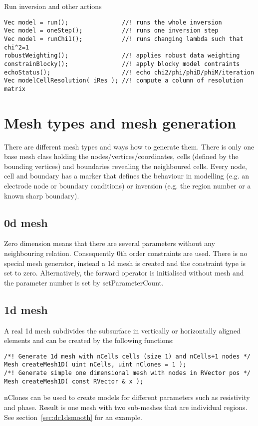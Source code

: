 Run inversion and other actions
\begin{lstlisting}
Vec model = run();               //! runs the whole inversion
Vec model = oneStep();           //! runs one inversion step
Vec model = runChi1();           //! runs changing lambda such that chi^2=1
robustWeighting();               //! applies robust data weighting
constrainBlocky();               //! apply blocky model contraints
echoStatus();                    //! echo chi2/phi/phiD/phiM/iteration
Vec modelCellResolution( iRes ); //! compute a column of resolution matrix
\end{lstlisting}

\clearpage
\section{Mesh types and mesh generation}\label{app:meshes}
There are different mesh types and ways how to generate them. There is only one base mesh class holding the nodes/vertices/coordinates, cells (defined by the bounding vertices) and boundaries revealing the neighboured cells.
Every node, cell and boundary has a marker that defines the behaviour in modelling (e.g. an electrode node or boundary conditions) or inversion (e.g. the region number or a known sharp boundary).

\subsection*{0d mesh}
Zero dimension means that there are several parameters without any neighbouring relation.
Consequently 0th order constraints are used.
There is no special mesh generator, instead a 1d mesh is created and the constraint type is set to zero.
Alternatively, the forward operator is initialised without mesh and the parameter number is set by setParameterCount.
\subsection*{1d mesh}
A real 1d mesh subdivides the subsurface in vertically or horizontally aligned elements and can be created by the following functions:
\begin{lstlisting}
/*! Generate 1d mesh with nCells cells (size 1) and nCells+1 nodes */
Mesh createMesh1D( uint nCells, uint nClones = 1 );
/*! Generate simple one dimensional mesh with nodes in RVector pos */
Mesh createMesh1D( const RVector & x );
\end{lstlisting}
nClones can be used to create models for different parameters such as resistivity and phase.
Result is one mesh with two sub-meshes that are individual regions.
See section~\ref{sec:dc1dsmooth} for an example.

